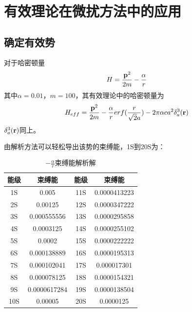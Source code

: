 \documentclass[hyperref,cs4size,titlepage,twoside]{ctexart}
\begin{document}
\clearpage
\section{有效理论在微扰方法中的应用}
\subsection{确定有效势}
对于哈密顿量
\begin{equation}\label{CoulombSmall}
  H=\frac{\vb{p}^2}{2m}-\frac{\alpha}{r}
\end{equation}
其中$\alpha=0.01$，$m=100$，其有效理论中的哈密顿量为
\begin{equation}\label{CoulombSmall}
  H_{eff}=\frac{\vb{p}^2}{2m}-\frac{\alpha}{r}erf(\frac{r}{\sqrt{2}a})-2\pi\alpha ca^2\delta_a^3(\vb{r})
\end{equation}
$\delta_a^3(\vb{r})$同上。

由解析方法可以轻松导出该势的束缚能，1S到20S为：
\begin{table}[!htbp]
  \centering
  \begin{tabular}{|cccc|}
    \hline
    能级&束缚能&能级&束缚能\\\hline
    1S & 0.005 & 11S & 0.0000413223 \\
    2S & 0.00125 & 12S & 0.0000347222 \\
    3S & 0.000555556 & 13S & 0.0000295858 \\
    4S & 0.0003125 & 14S & 0.0000255102 \\
    5S & 0.0002 & 15S & 0.0000222222 \\
    6S & 0.000138889 & 16S & 0.0000195313 \\
    7S & 0.000102041 & 17S & 0.000017301 \\
    8S & 0.000078125 & 18S & 0.0000154321 \\
    9S & 0.0000617284 & 19S & 0.0000138504 \\
    10S & 0.00005 & 20S & 0.0000125 \\
    \hline
  \end{tabular}
  \caption{$-\displaystyle\frac{\alpha}{r}$束缚能解析解}
\end{table}
\end{document}
